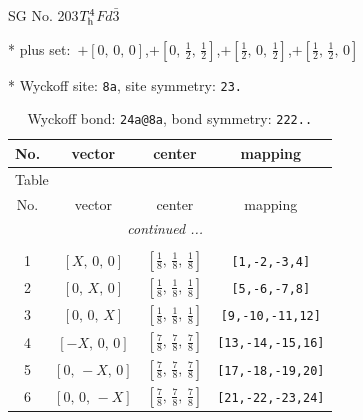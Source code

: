 \documentclass[fleqn,8pt]{jsarticle}
\begin{document}
\setcounter{MaxMatrixCols}{32}

\renewcommand{\tablename}{Table~}
\renewcommand{\figurename}{Figure~}
\begin{center}
\LARGE
SG No. 203\quad$T_{\rm h}^{4}$\quad$Fd\bar{3}$\quad[ cubic ]
\end{center}

* plus set:\,\,\,$+\left[ 0,\, 0,\, 0 \right]$,\quad $+\left[ 0,\, \frac{1}{2},\, \frac{1}{2} \right]$,\quad $+\left[ \frac{1}{2},\, 0,\, \frac{1}{2} \right]$,\quad $+\left[ \frac{1}{2},\, \frac{1}{2},\, 0 \right]$


* Wyckoff site: {\tt 8a}, site symmetry: {\tt 23.}
\renewcommand{\arraystretch}{1.2}
\begin{longtable}{cccc}
\caption{Wyckoff bond: {\tt 24a@8a}, bond symmetry: {\tt 222..}}
 \\
 \hline \hline
No. & vector & center & mapping \\ \hline \endfirsthead

\multicolumn{3}{l}{\tablename\ \thetable{}} \\
 \hline \hline
No. & vector & center & mapping \\ \hline \endhead

 \hline \hline
\multicolumn{3}{r}{\footnotesize\it continued ...} \\ \endfoot

 \hline \hline
\multicolumn{3}{r}{} \\ \endlastfoot

1 & $\left[ X,\, 0,\, 0 \right]$ & $\left[ \frac{1}{8},\, \frac{1}{8},\, \frac{1}{8} \right]$ & {\tt [1,-2,-3,4]} \\ \hline
2 & $\left[ 0,\, X,\, 0 \right]$ & $\left[ \frac{1}{8},\, \frac{1}{8},\, \frac{1}{8} \right]$ & {\tt [5,-6,-7,8]} \\ \hline
3 & $\left[ 0,\, 0,\, X \right]$ & $\left[ \frac{1}{8},\, \frac{1}{8},\, \frac{1}{8} \right]$ & {\tt [9,-10,-11,12]} \\ \hline
4 & $\left[ - X,\, 0,\, 0 \right]$ & $\left[ \frac{7}{8},\, \frac{7}{8},\, \frac{7}{8} \right]$ & {\tt [13,-14,-15,16]} \\ \hline
5 & $\left[ 0,\, - X,\, 0 \right]$ & $\left[ \frac{7}{8},\, \frac{7}{8},\, \frac{7}{8} \right]$ & {\tt [17,-18,-19,20]} \\ \hline
6 & $\left[ 0,\, 0,\, - X \right]$ & $\left[ \frac{7}{8},\, \frac{7}{8},\, \frac{7}{8} \right]$ & {\tt [21,-22,-23,24]} \\
\end{longtable}
\end{document}
